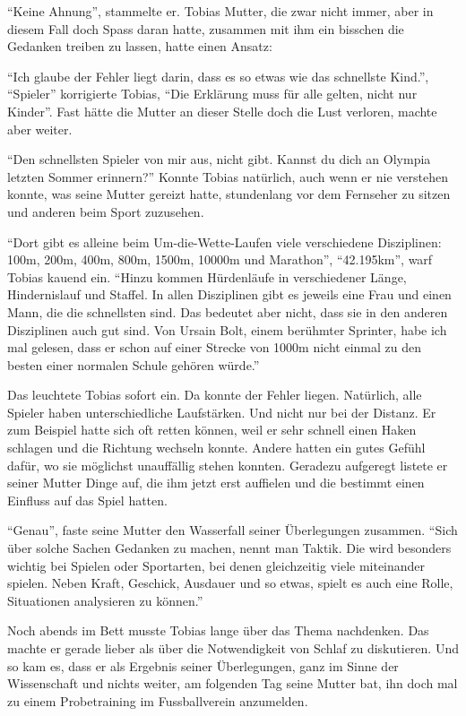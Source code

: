 \enquote{Keine Ahnung}, stammelte er. Tobias Mutter, die zwar nicht immer, aber in diesem Fall doch Spass daran hatte, zusammen mit ihm ein bisschen die Gedanken treiben zu lassen, hatte einen Ansatz:

\enquote{Ich glaube der Fehler liegt darin, dass es so etwas wie das schnellste Kind.}, \enquote{Spieler} korrigierte Tobias, \enquote{Die Erklärung muss für alle gelten, nicht nur Kinder}. Fast hätte die Mutter an dieser Stelle doch die Lust verloren, machte aber weiter.

\enquote{Den schnellsten Spieler von mir aus, nicht gibt. Kannst du dich an Olympia letzten Sommer erinnern?} Konnte Tobias natürlich, auch wenn er nie verstehen konnte, was seine Mutter gereizt hatte, stundenlang vor dem Fernseher zu sitzen und anderen beim Sport zuzusehen.


\enquote{Dort gibt es alleine beim Um-die-Wette-Laufen viele verschiedene Disziplinen: 100m, 200m, 400m, 800m, 1500m, 10000m und Marathon}, \enquote{42.195km}, warf Tobias kauend ein. \enquote{Hinzu kommen Hürdenläufe in verschiedener Länge, Hindernislauf und Staffel. In allen Disziplinen gibt es jeweils eine Frau und einen Mann, die die schnellsten sind. Das bedeutet aber nicht, dass sie in den anderen Disziplinen auch gut sind. Von Ursain Bolt, einem berühmter Sprinter, habe ich mal gelesen, dass er schon auf einer Strecke von 1000m nicht einmal zu den besten einer normalen Schule gehören würde.}

Das leuchtete Tobias sofort ein. Da konnte der Fehler liegen. Natürlich, alle Spieler haben unterschiedliche Laufstärken. Und nicht nur bei der Distanz. Er zum Beispiel hatte sich oft retten können, weil er sehr schnell einen Haken schlagen und die Richtung wechseln konnte. Andere hatten ein gutes Gefühl dafür, wo sie möglichst unauffällig stehen konnten. Geradezu aufgeregt listete er seiner Mutter Dinge auf, die ihm jetzt erst auffielen und die bestimmt einen Einfluss auf das Spiel hatten.

\enquote{Genau}, faste seine Mutter den Wasserfall seiner Überlegungen zusammen. \enquote{Sich über solche Sachen Gedanken zu machen, nennt man Taktik. Die wird besonders wichtig bei Spielen oder Sportarten, bei denen gleichzeitig viele miteinander spielen. Neben Kraft, Geschick, Ausdauer und so etwas, spielt es auch eine Rolle, Situationen analysieren zu können.}

Noch abends im Bett musste Tobias lange über das Thema nachdenken. Das machte er gerade lieber als über die Notwendigkeit von Schlaf zu diskutieren. Und so kam es, dass er als Ergebnis seiner Überlegungen, ganz im Sinne der Wissenschaft und nichts weiter, am folgenden Tag seine Mutter bat, ihn doch mal zu einem Probetraining im Fussballverein anzumelden.
\newpage
 

 
